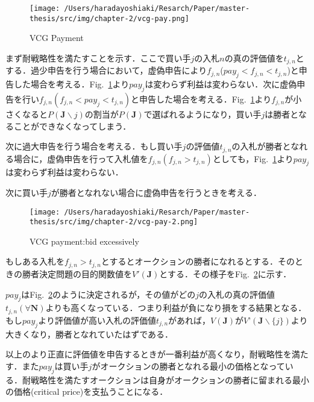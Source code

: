 \begin{figure}[H]
\hypertarget{fig:vcg-pay}{%
\centering
\texttt{[image: /Users/haradayoshiaki/Resarch/Paper/master-thesis/src/img/chapter-2/vcg-pay.png]}
\caption{VCG Payment}\label{fig:vcg-pay}
}
\end{figure}

まず耐戦略性を満たすことを示す．ここで買い手\(j\)の入札\(n\)の真の評価値を\(t_{j,n}\)とする．過少申告を行う場合において，虚偽申告により\(f_{j,n}\)(\(pay_j<f_{j,n}<t_{j,n}\))と申告した場合を考える．Fig.~\ref{fig:vcg-pay}より\(pay_j\)は変わらず利益は変わらない．次に虚偽申告を行い\(f_{j,n}(f_{j,n}<pay_j<t_{j,n})\)と申告した場合を考える．Fig.~\ref{fig:vcg-pay}より\(f_{j,n}\)が小さくなると\(P(\boldsymbol{J}\backslash{j})\)の割当が\(P(\boldsymbol{J})\)で選ばれるようになり，買い手\(j\)は勝者となることができなくなってしまう．

次に過大申告を行う場合を考える．もし買い手\(j\)の評価値\(t_{j,n}\)の入札が勝者となれる場合に，虚偽申告を行って入札値を\(f_{j,n}(f_{j,n}>t_{j,n})\)としても，Fig.~\ref{fig:vcg-pay}より\(pay_j\)は変わらず利益は変わらない．

次に買い手\(j\)が勝者となれない場合に虚偽申告を行うときを考える．

\begin{figure}[H]
\hypertarget{fig:vcg-pay-2}{%
\centering
\texttt{[image: /Users/haradayoshiaki/Resarch/Paper/master-thesis/src/img/chapter-2/vcg-pay-2.png]}
\caption{VCG payment:bid excessively}\label{fig:vcg-pay-2}
}
\end{figure}

もしある入札を\(f_{j,n}>t_{j,n}\)とするとオークションの勝者になれるとする．そのときの勝者決定問題の目的関数値を\(V'(\boldsymbol{J})\)とする．その様子をFig.~\ref{fig:vcg-pay-2}に示す．

\(pay_j\)はFig.~\ref{fig:vcg-pay-2}のように決定されるが，その値がどの\(j\)の入札の真の評価値\(t_{j,n} (\forall \boldsymbol{N})\)よりも高くなっている．つまり利益が負になり損をする結果となる．もし\(pay_j\)より評価値が高い入札の評価値\(t_{j,n}\)があれば，\(V(\boldsymbol{J})\)が\(V’({\boldsymbol{J}\backslash{\{j\}}})\)より大きくなり，勝者となれていたはずである．

以上のより正直に評価値を申告するときが一番利益が高くなり，耐戦略性を満たす．また\(pay_j\)は買い手\(j\)がオークションの勝者となれる最小の価格となっている．耐戦略性を満たすオークションは自身がオークションの勝者に留まれる最小の価格(critical
price)を支払うことになる．

